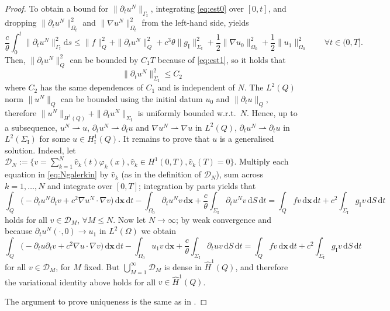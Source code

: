 \documentclass[a4paper]{article}
\theoremstyle{plain}
\theoremstyle{definition}
\newcommand{\dx}{{\,\mathrm{d}\vect x}}
\newcommand{\dt}{{\,\mathrm{d}t}}
\newcommand{\dS}{{\,\mathrm{d}S}}
\newcommand{\Grad}[1]{\nabla #1}
\newcommand{\TimeDer}{{\partial^{}_t}}
\newcommand{\vect}[1]{\bm{#1}}
\newcommand{\weakto}{{\rightharpoonup}}
\newcommand{\wrt}{{\textrm{w.r.t.\ }}}
\newcommand{\GI}{{\Gamma_{\mathrm I}}}
\newcommand{\SI}{{\Sigma_{\mathrm I}}}
\newcommand{\gI}{{g_{\mathrm I}}}
\newcommand{\OZ}{{\Omega_0}}
\newcommand{\HoneImp}{{H^1_{\mathrm I}}}
\begin{document}
\begin{proof}
	To obtain a bound for $\|\TimeDer u^N\|_\GI$, integrating \eqref{eq:est0} over $[0,t]$, and dropping $\|\TimeDer u^N\|^2_{\Omega_t}$ and $\|\Grad u^N\|^2_{\Omega_t}$ from the left-hand side, yields
	\begin{equation*}
		\frac{c}{\theta}\int_0^t \|\TimeDer u^N\|_\GI^2 \mathrm{d}s
		\le \|f\|^2_Q
		+\|\TimeDer u^N\|^2_Q
		+c^3\theta \|\gI\|^2_\SI
		+\frac12\|\Grad u_0\|^2_\OZ
		+\frac12\|u_1\|^2_\OZ
		\qquad \forall t \in (0, T].
	\end{equation*}
	Then, $\|\TimeDer u^N\|^2_Q$ can be bounded by $C_1 T$ because of \eqref{eq:est1}, so it holds that
	\begin{equation*}
		\|\TimeDer u^N\|^2_{\SI} \leq C_2
	\end{equation*}
	where $C_2$ has the same dependences of $C_1$ and is independent of $N$.
The $L^2(Q)$ norm $\|u^N\|_Q$ can be bounded using the initial datum $u_0$ and $\|\TimeDer u\|_Q$, therefore $\|u^N\|_{H^1(Q)}+\|\TimeDer u^N\|_\SI$ is uniformly bounded \wrt $N$.
	Hence, up to a subsequence, $u^N \weakto u$, $\TimeDer u^N \weakto \TimeDer u$ and $\Grad u^N \weakto \Grad u$ in $L^2(Q)$, $\TimeDer u^N \weakto \TimeDer u$ in $L^2(\SI)$ for some $u \in \HoneImp(Q)$. It remains to prove that $u$ is a generalised solution.
	Indeed, let $\mathcal{D}_N := \{v = \sum_{k=1}^N \hat{v}_k(t) \varphi_k(x), \hat{v}_k \in H^1(0,T), \hat{v}_k(T) = 0\}$.
	Multiply each equation in \eqref{eq:Ngalerkin} by $\hat{v}_k$ (as in the definition of $\mathcal{D}_N$), sum across $k = 1, \dots, N$ and integrate over $[0,T]$; integration by parts yields that
	\begin{equation*}
		\int_Q \big(-\TimeDer u^N \TimeDer v + c^2 \Grad u^N \cdot \Grad v \big)\dx \dt - \int_{\Omega_0}\TimeDer u^N v \dx + \frac{c}{\theta} \int_\SI \TimeDer u^N v \dS \dt = \int_Q f v \dx \dt + c^2 \int_\SI \gI v \dS \dt
	\end{equation*}
	holds for all $v \in \mathcal{D}_{M}$, $\forall M\leq N$.
Now let $N \rightarrow \infty$; by weak convergence and because $\TimeDer u^N(\cdot, 0) \rightarrow u_1$ in $L^2(\Omega)$ we obtain
	\begin{equation*}
		\int_Q \big(-\TimeDer u \TimeDer v + c^2 \Grad u \cdot \Grad v \big)\dx \dt - \int_{\Omega_0}u_1 v \dx + \frac{c}{\theta} \int_\SI \TimeDer u v \dS \dt = \int_Q f v \dx \dt + c^2 \int_\SI \gI v \dS \dt
	\end{equation*}
	for all $v \in \mathcal{D}_{M}$, for $M$ fixed. But $\bigcup_{M = 1}^{\infty} \mathcal{D}_M$ is dense in $\widehat{H}^1(Q)$, and therefore the variational identity above holds for all $v \in \widehat{H}^1(Q)$.

	The argument to prove uniqueness is the same as in \cite[Thm.~IV.3.1]{ladyzhenskaya-bvp}.
\end{proof}
\end{document}
